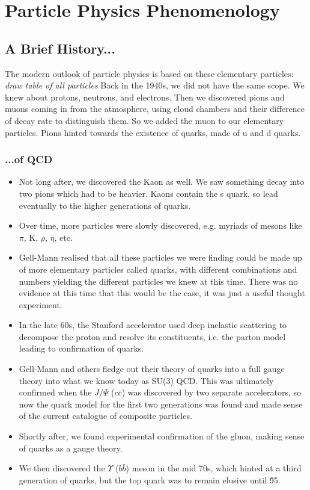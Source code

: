 \documentclass[relqm.tex]{subfiles}
\begin{document}
\part{Particle Physics Phenomenology}
\chapter{A Brief History...}
The modern outlook of particle physics is based on these elementary particles:
\textit{draw table of all particles}
Back in the 1940s, we did not have the same scope. 
We knew about protons, neutrons, and electrons. 
Then we discovered pions and muons coming in from the atmosphere, using cloud chambers and their difference of decay rate to distinguish them.
So we added the muon to our elementary particles.
Pions hinted towards the existence of quarks, made of u and d quarks.

\section{...of QCD}
\begin{itemize}
    \item Not long after, we discovered the Kaon as well. 
        We saw something decay into two pions which had to be heavier. 
        Kaons contain the s quark, so lead eventually to the higher generations of quarks. 
    \item Over time, more particles were slowly discovered, e.g. myriads of mesons like $\pi$, K, $\rho$, $\eta$, etc. 
    \item Gell-Mann realised that all these particles we were finding could be made up of more elementary particles called quarks, with different combinations and numbers yielding the different particles we knew at this time.
        There was no evidence at this time that this would be the case, it was just a useful thought experiment. 
    \item In the late 60s, the Stanford accelerator used deep inelastic scattering to decompose the proton and resolve its constituents, i.e. the parton model leading to confirmation of quarks.
    \item Gell-Mann and others fledge out their theory of quarks into a full gauge theory into what we know today as SU(3) QCD.
        This was ultimately confirmed when the $J/\Psi$ ($c\bar{c}$) was discovered by two separate accelerators, so now the quark model for the first two generations was found and made sense of the current catalogue of composite particles.
    \item Shortly after, we found experimental confirmation of the gluon, making sense of quarks as a gauge theory. 
    \item We then discovered the $\Upsilon$ ($b\bar{b}$) meson in the mid 70s, which hinted at a third generation of quarks, but the top quark was to remain elusive until \~95.
\end{itemize}
\end{document}
